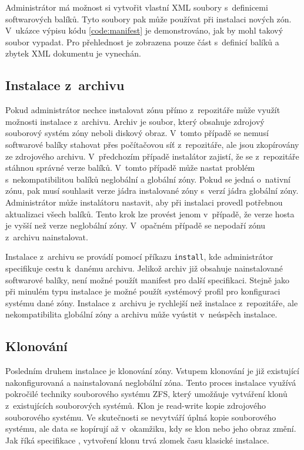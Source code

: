 Administrátor má možnost si vytvořit vlastní XML soubory s~definicemi softwarových balíků. Tyto soubory pak může používat
při instalaci nových zón. V~ukázce výpisu kódu \ref{code:manifest} je demonstrováno, jak by mohl takový soubor vypadat.
Pro přehlednost je zobrazena pouze část s~definicí balíků a zbytek XML dokumentu je vynechán.
\subsection{Instalace z~archivu}
\label{chapter:zones:instalation:archive}
Pokud administrátor nechce instalovat zónu přímo z~repozitáře může využít možnosti instalace z~archivu. Archiv je soubor, který obsahuje
zdrojový souborový systém zóny neboli diskový obraz. V~tomto případě se nemusí softwarové balíky stahovat přes počítačovou síť z~repozitáře,
ale jsou zkopírovány ze zdrojového archivu. V~předchozím případě instalátor zajistí, že se z~repozitáře stáhnou správné verze
balíků. V~tomto případě může nastat problém s~nekompatibilitou balíků neglobální a 
globální zóny. Pokud se jedná o~nativní zónu, pak musí souhlasit verze jádra instalované zóny s~verzí jádra globální zóny. 
Administrátor může instalátoru nastavit, aby při instalaci provedl potřebnou aktualizaci všech balíků. Tento krok lze provést
jenom v~případě, že verze hosta je vyšší než verze neglobální zóny. V~opačném případě se nepodaří zónu z~archivu nainstalovat.

Instalace z~archivu se provádí pomocí příkazu \verb|install|, kde administrátor specifikuje
cestu k~danému archivu. Jelikož archiv již obsahuje nainstalované softwarové balíky, není možné použít manifest pro další specifikaci.
Stejně jako při minulém typu instalace je možné použít systémový profil pro konfiguraci systému dané zóny. Instalace
z~archivu je rychlejší než instalace z~repozitáře, ale nekompatibilita globální zóny a archivu může vyústit v~neúspěch instalace.
\subsection{Klonování}
\label{chapter:zones:instalation:cloning}
Posledním druhem instalace je klonování zóny. Vstupem klonování je již existující nakonfigurovaná a nainstalovaná
neglobální zóna. Tento proces instalace využívá pokročilé techniky souborového systému ZFS, který umožňuje vytváření klonů z~existujících
souborových systémů. Klon je read-write kopie zdrojového souborového systému. Ve skutečnosti se nevytváří úplná kopie
souborového systému, ale data se kopírují až v~okamžiku, kdy se klon nebo jeho obraz změní. Jak říká specifikace \cite{oracle:solaris:zones:clonning},
vytvoření klonu trvá zlomek času klasické instalace. 

